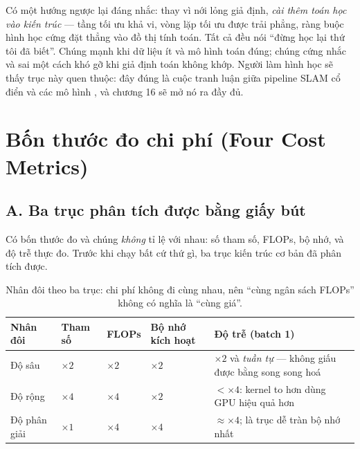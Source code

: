 \documentclass[../../deep_learning.tex]{subfiles}
\begin{document}
Có một hướng ngược lại đáng nhắc: thay vì nới lỏng giả định, \emph{cài thêm toán học vào kiến trúc} --- tầng tối ưu khả vi, vòng lặp tối ưu được trải phẳng, ràng buộc hình học cứng đặt thẳng vào đồ thị tính toán. Tất cả đều nói ``đừng học lại thứ tôi đã biết''. Chúng mạnh khi dữ liệu ít và mô hình toán đúng; chúng cứng nhắc và sai một cách khó gỡ khi giả định toán không khớp. Người làm hình học sẽ thấy trục này quen thuộc: đây đúng là cuộc tranh luận giữa pipeline SLAM cổ điển và các mô hình , và chương 16 sẽ mở nó ra đầy đủ.

\section{Bốn thước đo chi phí (Four Cost Metrics)}

\subsection{A. Ba trục phân tích được bằng giấy bút}

Có bốn thước đo và chúng \emph{không} tỉ lệ với nhau: số tham số, FLOPs, bộ nhớ, và độ trễ thực đo. Trước khi chạy bất cứ thứ gì, ba trục kiến trúc cơ bản đã phân tích được.

\begin{table}[H]\centering\small
\caption{Nhân đôi theo ba trục: chi phí không đi cùng nhau, nên ``cùng ngân sách FLOPs'' không có nghĩa là ``cùng giá''.}
\label{tab:ba-truc}
\begin{tabularx}{\linewidth}{@{}L{2.1cm}L{1.6cm}L{1.5cm}L{2.3cm}Y@{}}
\toprule
\textbf{Nhân đôi} & \textbf{Tham số} & \textbf{FLOPs} & \textbf{Bộ nhớ kích hoạt} & \textbf{Độ trễ (batch 1)}\\
\midrule
Độ sâu & \(\times 2\) & \(\times 2\) & \(\times 2\) & \(\times 2\) và \emph{tuần tự} --- không giấu được bằng song song hoá\\
Độ rộng & \(\times 4\) & \(\times 4\) & \(\times 2\) & \(< \times 4\): kernel to hơn dùng GPU hiệu quả hơn\\
Độ phân giải & \(\times 1\) & \(\times 4\) & \(\times 4\) & \(\approx \times 4\); là trục dễ tràn bộ nhớ nhất\\
\bottomrule
\end{tabularx}
\end{table}
\end{document}
